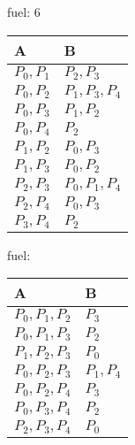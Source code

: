     
    \begin{minipage}[t]{0.30\textwidth}
        fuel: 6\\
    \begin{tabular}{l|l}
        A & B \\\hline
        $P_0, P_1$ & $P_2, P_3$ \\
        $P_0, P_2$ & $P_1, P_3, P_4$ \\	
        $P_0, P_3$ & $P_1, P_2$ \\
        $P_0, P_4$ & $P_2$ \\
        $P_1, P_2$ & $P_0, P_3$\\
        $P_1, P_3$ & $P_0, P_2$\\
        $P_2, P_3$ & $P_0, P_1, P_4$\\
        $P_2, P_4$ & $P_0, P_3$\\
        $P_3, P_4$ & $P_2$\\
    \end{tabular}
    \end{minipage}
    \begin{minipage}[t]{0.30\textwidth}
        fuel: \\
    \begin{tabular}{l|l}
        A & B \\\hline
        $P_0, P_1, P_2$ & $P_3$ \\
        $P_0, P_1, P_3$ & $P_2$ \\
        $P_1, P_2, P_3$ & $P_0$ \\
        $P_0, P_2, P_3$ & $P_1, P_4$ \\
        $P_0, P_2, P_4$ & $P_3$ \\
        $P_0, P_3, P_4$ & $P_2$ \\
        $P_2, P_3, P_4$ & $P_0$ \\
    
    \end{tabular}
    \end{minipage}
